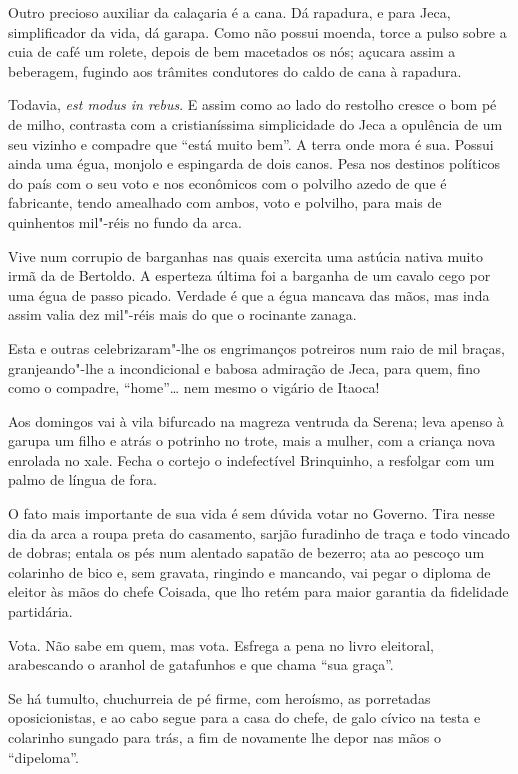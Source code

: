 Outro precioso auxiliar da calaçaria é a cana. Dá rapadura, e para Jeca,
simplificador da vida, dá garapa. Como não possui moenda, torce a pulso
sobre a cuia de café um rolete, depois de bem macetados os nós; açucara
assim a beberagem, fugindo aos trâmites condutores do caldo de cana à
rapadura.

Todavia, \emph{est modus in rebus}. E assim como ao lado do restolho
cresce o bom pé de milho, contrasta com a cristianíssima simplicidade do
Jeca a opulência de um seu vizinho e compadre que ``está muito bem''. A
terra onde mora é sua. Possui ainda uma égua, monjolo e espingarda de
dois canos. Pesa nos destinos políticos do país com o seu voto e nos
econômicos com o polvilho azedo de que é fabricante, tendo amealhado com
ambos, voto e polvilho, para mais de quinhentos mil"-réis no fundo da
arca.

Vive num corrupio de barganhas nas quais exercita uma astúcia nativa
muito irmã da de Bertoldo. A esperteza última foi a barganha de um
cavalo cego por uma égua de passo picado. Verdade é que a égua mancava
das mãos, mas inda assim valia dez mil"-réis mais do que o rocinante
zanaga.

Esta e outras celebrizaram"-lhe os engrimanços potreiros num raio de mil
braças, granjeando"-lhe a incondicional e babosa admiração de Jeca, para
quem, fino como o compadre, ``home''\ldots{} nem mesmo o vigário de Itaoca!

Aos domingos vai à vila bifurcado na magreza ventruda da Serena; leva
apenso à garupa um filho e atrás o potrinho no trote, mais a mulher, com
a criança nova enrolada no xale. Fecha o cortejo o indefectível
Brinquinho, a resfolgar com um palmo de língua de fora.

O fato mais importante de sua vida é sem dúvida votar no Governo. Tira
nesse dia da arca a roupa preta do casamento, sarjão furadinho de traça
e todo vincado de dobras; entala os pés num alentado sapatão de bezerro;
ata ao pescoço um colarinho de bico e, sem gravata, ringindo e mancando,
vai pegar o diploma de eleitor às mãos do chefe Coisada, que lho retém
para maior garantia da fidelidade partidária.

Vota. Não sabe em quem, mas vota. Esfrega a pena no livro eleitoral,
arabescando o aranhol de gatafunhos e que chama ``sua graça''.

Se há tumulto, chuchurreia de pé firme, com heroísmo, as porretadas
oposicionistas, e ao cabo segue para a casa do chefe, de galo cívico na
testa e colarinho sungado para trás, a fim de novamente lhe depor nas
mãos o ``dipeloma''.

